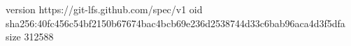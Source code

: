 version https://git-lfs.github.com/spec/v1
oid sha256:40fc456c54bf2150b67674bac4bcb69e236d2538744d33c6bab96aca4d3f5dfa
size 312588

